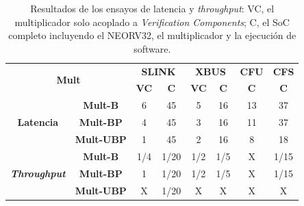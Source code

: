 \begin{table}[h!]
\centering
\caption{Resultados de los ensayos de latencia y \textit{throughput}: VC, el multiplicador solo acoplado a \textit{Verification Components}; C, el SoC completo incluyendo el NEORV32, el multiplicador y la ejecución de software.}
\label{tab:4}
\begin{tabular}{|cc|cc|cc|c|c|}
\hline
\multicolumn{2}{|c|}{\multirow{2}{*}{\textbf{Mult}}}                                    & \multicolumn{2}{c|}{\textbf{SLINK}}           & \multicolumn{2}{c|}{\textbf{XBUS}}            & \textbf{CFU} & \textbf{CFS} \\ \cline{3-8} 
\multicolumn{2}{|c|}{}                                                                  & \multicolumn{1}{c|}{\textbf{VC}} & \textbf{C} & \multicolumn{1}{c|}{\textbf{VC}} & \textbf{C} & \textbf{C}   & \textbf{C}   \\ \hline
\multicolumn{1}{|c|}{\multirow{3}{*}{\textbf{Latencia}}}            & \textbf{Mult-B}   & \multicolumn{1}{c|}{6}           & 45         & \multicolumn{1}{c|}{5}           & 16         & 13           & 37           \\ \cline{2-8} 
\multicolumn{1}{|c|}{}                                              & \textbf{Mult-BP}  & \multicolumn{1}{c|}{4}           & 45         & \multicolumn{1}{c|}{3}           & 16         & 11           & 37           \\ \cline{2-8} 
\multicolumn{1}{|c|}{}                                              & \textbf{Mult-UBP} & \multicolumn{1}{c|}{1}           & 45         & \multicolumn{1}{c|}{2}           & 16         & 8            & 18           \\ \hline
\multicolumn{1}{|c|}{\multirow{3}{*}{\textit{\textbf{Throughput}}}} & \textbf{Mult-B}   & \multicolumn{1}{c|}{1/4}         & 1/20       & \multicolumn{1}{c|}{1/2}         & 1/5        & X            & 1/15         \\ \cline{2-8} 
\multicolumn{1}{|c|}{}                                              & \textbf{Mult-BP}  & \multicolumn{1}{c|}{1}           & 1/20       & \multicolumn{1}{c|}{1/2}         & 1/5        & X            & 1/15         \\ \cline{2-8} 
\multicolumn{1}{|c|}{}                                              & \textbf{Mult-UBP} & \multicolumn{1}{c|}{X}           & 1/20       & \multicolumn{1}{c|}{X}           & X          & X            & X            \\ \hline
\end{tabular}
\end{table}

